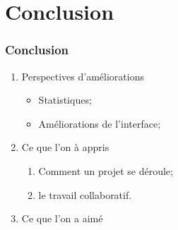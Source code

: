 \documentclass[12pt]{beamer}
\begin{document}
\section{Conclusion}
    \begin{frame}
    \frametitle{Conclusion}
        
        \begin{enumerate}
            \item Perspectives d'améliorations
            \begin{itemize}
                \item Statistiques;
                \item Améliorations de l'interface;
            \end{itemize}
            
            \item Ce que l'on à appris
            \begin{enumerate}
                \item Comment un projet se déroule;
                \item le travail collaboratif.
            \end{enumerate}
            
            \item Ce que l'on a aimé
            
         
        \end{enumerate}
    \end{frame}
    
\appendix[Questions ?]
\end{document}
